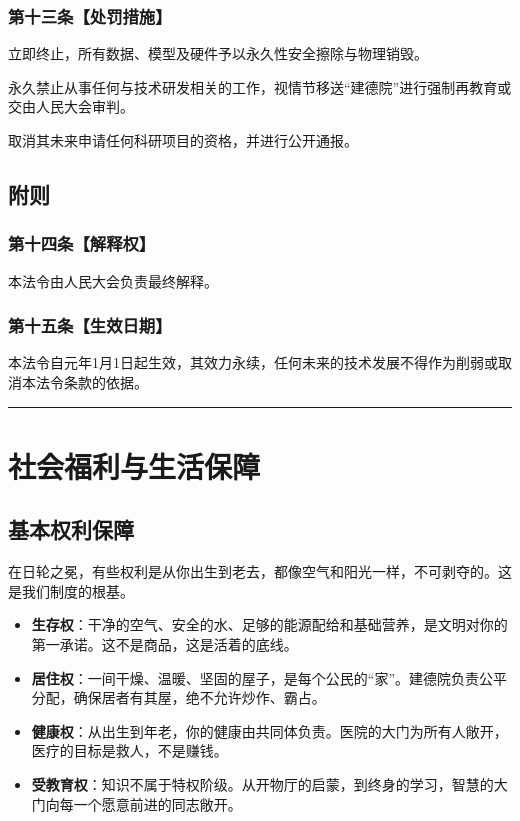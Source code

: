 \subsubsection{第十三条【处罚措施】}\label{ux7b2cux5341ux4e09ux6761ux5904ux7f5aux63aaux65bd}

立即终止，所有数据、模型及硬件予以永久性安全擦除与物理销毁。

永久禁止从事任何与技术研发相关的工作，视情节移送``建德院''进行强制再教育或交由人民大会审判。

取消其未来申请任何科研项目的资格，并进行公开通报。

\subsection{附则}\label{ux7b2cux4e94ux7ae0-ux9644ux5219}

\subsubsection{第十四条【解释权】}\label{ux7b2cux5341ux56dbux6761ux89e3ux91caux6743}

本法令由人民大会负责最终解释。

\subsubsection{第十五条【生效日期】}\label{ux7b2cux5341ux4e94ux6761ux751fux6548ux65e5ux671f}

本法令自元年1月1日起生效，其效力永续，任何未来的技术发展不得作为削弱或取消本法令条款的依据。

\begin{center}\rule{0.5\linewidth}{0.5pt}\end{center}

\section{社会福利与生活保障}\label{ux793eux4f1aux798fux5229ux4e0eux751fux6d3bux4fddux969c}

\subsection{基本权利保障}\label{ux57faux672cux6743ux5229ux4fddux969c}

在日轮之冕，有些权利是从你出生到老去，都像空气和阳光一样，不可剥夺的。这是我们制度的根基。

\begin{itemize}
\item
  \textbf{生存权}：干净的空气、安全的水、足够的能源配给和基础营养，是文明对你的第一承诺。这不是商品，这是活着的底线。
\item
  \textbf{居住权}：一间干燥、温暖、坚固的屋子，是每个公民的``家''。建德院负责公平分配，确保居者有其屋，绝不允许炒作、霸占。
\item
  \textbf{健康权}：从出生到年老，你的健康由共同体负责。医院的大门为所有人敞开，医疗的目标是救人，不是赚钱。
\item
  \textbf{受教育权}：知识不属于特权阶级。从开物厅的启蒙，到终身的学习，智慧的大门向每一个愿意前进的同志敞开。
\end{itemize}

